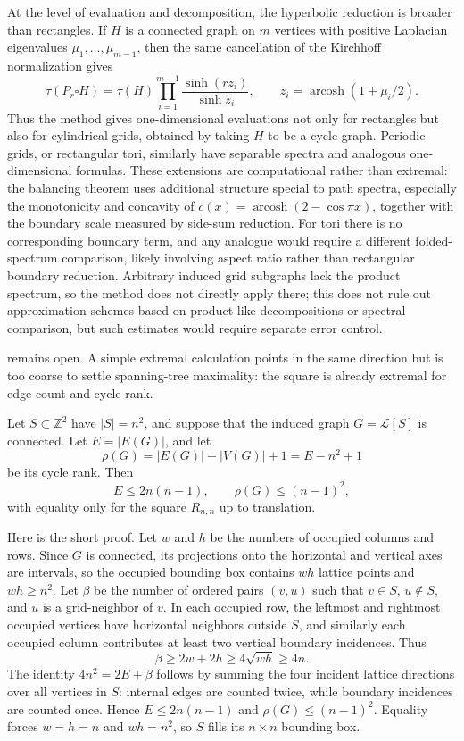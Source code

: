 \documentclass[11pt]{article}
\numberwithin{equation}{section}
\DeclareMathOperator{\arcosh}{arcosh}
\newcommand{\Z}{\mathbb{Z}}
\begin{document}
At the level of evaluation and decomposition, the hyperbolic reduction is broader than rectangles. If $H$ is a connected graph on $m$ vertices with positive Laplacian eigenvalues $\mu_1,\ldots,\mu_{m-1}$, then the same cancellation of the Kirchhoff normalization gives
\[
  \tau(P_r\square H)
  =
  \tau(H)\prod_{i=1}^{m-1}
  \frac{\sinh(rz_i)}{\sinh z_i},
  \qquad
  z_i=\arcosh(1+\mu_i/2).
\]
Thus the method gives one-dimensional evaluations not only for rectangles but also for cylindrical grids, obtained by taking $H$ to be a cycle graph. Periodic grids, or rectangular tori, similarly have separable spectra and analogous one-dimensional formulas. These extensions are computational rather than extremal: the balancing theorem uses additional structure special to path spectra, especially the monotonicity and concavity of $c(x)=\arcosh(2-\cos\pi x)$, together with the boundary scale measured by side-sum reduction. For tori there is no corresponding boundary term, and any analogue would require a different folded-spectrum comparison, likely involving aspect ratio rather than rectangular boundary reduction. Arbitrary induced grid subgraphs lack the product spectrum, so the method does not directly apply there; this does not rule out approximation schemes based on product-like decompositions or spectral comparison, but such estimates would require separate error control.

 remains open. A simple extremal calculation points in the same direction but is too coarse to settle spanning-tree maximality: the square is already extremal for edge count and cycle rank.

Let $S\subset\Z^2$ have $|S|=n^2$, and suppose that the induced graph $G=\mathcal L[S]$ is connected. Let $E=|E(G)|$, and let
\[
  \rho(G)=|E(G)|-|V(G)|+1=E-n^2+1
\]
be its cycle rank. Then
\[
  E\le 2n(n-1),
  \qquad
  \rho(G)\le (n-1)^2,
\]
with equality only for the square $R_{n,n}$ up to translation.

Here is the short proof. Let $w$ and $h$ be the numbers of occupied columns and rows. Since $G$ is connected, its projections onto the horizontal and vertical axes are intervals, so the occupied bounding box contains $wh$ lattice points and $wh\ge n^2$. Let $\beta$ be the number of ordered pairs $(v,u)$ such that $v\in S$, $u\notin S$, and $u$ is a grid-neighbor of $v$. In each occupied row, the leftmost and rightmost occupied vertices have horizontal neighbors outside $S$, and similarly each occupied column contributes at least two vertical boundary incidences. Thus
\[
  \beta\ge 2w+2h\ge4\sqrt{wh}\ge4n.
\]
The identity $4n^2=2E+\beta$ follows by summing the four incident lattice directions over all vertices in $S$: internal edges are counted twice, while boundary incidences are counted once. Hence $E\le2n(n-1)$ and $\rho(G)\le(n-1)^2$. Equality forces $w=h=n$ and $wh=n^2$, so $S$ fills its $n\times n$ bounding box.
\end{document}
